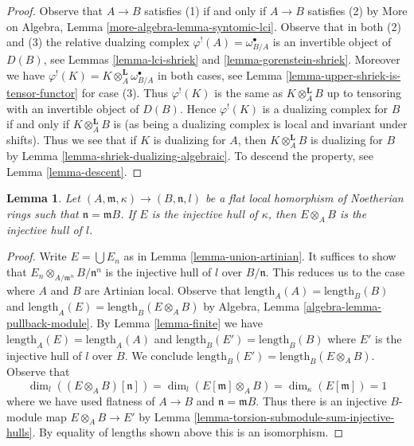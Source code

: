\documentclass{stacks-project}
\theoremstyle{plain}
\newtheorem{lemma}[subsection]{Lemma}
\theoremstyle{definition}
\theoremstyle{remark}
\numberwithin{equation}{subsection}
\begin{document}
\begin{proof}
Observe that $A \to B$ satisfies (1) if and only if $A \to B$
satisfies (2) by  More on Algebra, Lemma \ref{more-algebra-lemma-syntomic-lci}.
Observe that in both (2) and (3) the relative dualzing
complex $\varphi^!(A) = \omega_{B/A}^\bullet$ is an invertible
object of $D(B)$, see
Lemmas \ref{lemma-lci-shriek} and \ref{lemma-gorenstein-shriek}.
Moreover we have
$\varphi^!(K) = K \otimes_A^\mathbf{L} \omega_{B/A}^\bullet$
in both cases, see Lemma \ref{lemma-upper-shriek-is-tensor-functor}
for case (3).
Thus $\varphi^!(K)$ is the same as $K \otimes_A^\mathbf{L} B$
up to tensoring with an invertible object of $D(B)$.
Hence $\varphi^!(K)$ is a dualizing complex for $B$
if and only if $K \otimes_A^\mathbf{L} B$ is
(as being a dualizing complex is local and invariant under shifts).
Thus we see that if $K$ is dualizing for $A$, then
$K \otimes_A^\mathbf{L} B$ is dualizing for $B$ by
Lemma \ref{lemma-shriek-dualizing-algebraic}.
To descend the property, see
Lemma \ref{lemma-descent}.
\end{proof}

\begin{lemma}
\label{lemma-injective-hull-goes-up}
Let $(A, \mathfrak m, \kappa) \to (B, \mathfrak n, l)$
be a flat local homorphism of Noetherian rings such that
$\mathfrak n = \mathfrak m B$. If $E$ is the injective
hull of $\kappa$, then $E \otimes_A B$ is the injective
hull of $l$.
\end{lemma}

\begin{proof}
Write $E = \bigcup E_n$ as in Lemma \ref{lemma-union-artinian}.
It suffices to show that $E_n \otimes_{A/\mathfrak m^n} B/\mathfrak n^n$
is the injective hull of $l$ over $B/\mathfrak n$.
This reduces us to the case where $A$ and $B$ are Artinian local.
Observe that $\text{length}_A(A) = \text{length}_B(B)$ and
$\text{length}_A(E) = \text{length}_B(E \otimes_A B)$
by Algebra, Lemma \ref{algebra-lemma-pullback-module}.
By Lemma \ref{lemma-finite} we have
$\text{length}_A(E) = \text{length}_A(A)$ and
$\text{length}_B(E') = \text{length}_B(B)$
where $E'$ is the injective hull of $l$ over $B$.
We conclude $\text{length}_B(E') = \text{length}_B(E \otimes_A B)$.
Observe that
$$
\dim_l((E \otimes_A B)[\mathfrak n]) =
\dim_l(E[\mathfrak m] \otimes_A B) =
\dim_\kappa(E[\mathfrak m]) = 1
$$
where we have used flatness of $A \to B$ and $\mathfrak n = \mathfrak mB$.
Thus there is an injective $B$-module map $E \otimes_A B \to E'$
by Lemma \ref{lemma-torsion-submodule-sum-injective-hulls}.
By equality of lengths shown above this is an isomorphism.
\end{proof}
\end{document}
